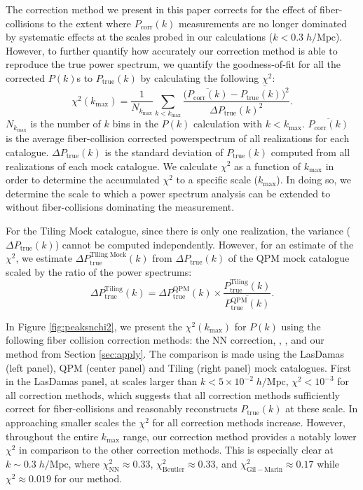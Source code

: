 \documentclass{emulateapj}
\begin{document}
The correction method we present in this paper corrects for the effect of fiber-collisions to the extent where $P_\mathrm{corr}(k)$ measurements are no longer dominated by systematic effects at the scales probed in our calculations ($k < 0.3 \; h/\mathrm{Mpc}$). However, to further quantify how accurately our correction method is able to reproduce the true power spectrum, we quantify the goodness-of-fit for all the corrected $P(k)$s to $P_\mathrm{true}(k)$ by calculating the following $\chi^2$: 
\begin{equation}
\chi^2 (k_\mathrm{max}) = \frac{1}{N_{k_\mathrm{max}}} \sum\limits_{k< k_\mathrm{max}} \frac{(\overline{P_\mathrm{corr}(k)} - \overline{P_\mathrm{true}(k))^2}}{\Delta P_\mathrm{true} (k)^2}. \label{eq:chi2}
\end{equation}
$N_{k_\mathrm{max}}$ is the number of $k$ bins in the $P(k)$ calculation with $k < k_\mathrm{max}$. $\overline{P_\mathrm{corr}(k)}$ is the average fiber-collision corrected powerspectrum of all realizations for each catalogue. $\Delta P_\mathrm{true}(k)$ is the standard deviation of $P_\mathrm{true}(k)$ computed from all realizations of each mock catalogue. We calculate $\chi^2$ as a function of $k_\mathrm{max}$ in order to determine the accumulated $\chi^2$ to a specific scale ($k_\mathrm{max}$). In doing so, we determine the scale to which a power spectrum analysis can be extended to without fiber-collisions dominating the measurement. 

For the Tiling Mock catalogue, since there is only one realization, the variance ($\Delta P_\mathrm{true} (k)$) cannot be computed independently. However, for an estimate of the $\chi^2$, we estimate $\Delta P_\mathrm{true}^\mathrm{Tiling\;Mock}(k)$ from $\Delta P_\mathrm{true} (k)$ of the QPM mock catalogue scaled by the ratio of the power spectrums:
\begin{equation}
\Delta P_\mathrm{true}^\mathrm{Tiling}(k) = \Delta P_\mathrm{true}^\mathrm{QPM}(k) \times \frac{P_\mathrm{true}^\mathrm{Tiling}(k)}{\overline{P^\mathrm{QPM}_\mathrm{true}(k)}}.
\end{equation}

In Figure \ref{fig:peaksnchi2}, we present the $\chi^2(k_\mathrm{max})$ for $P(k)$ using the following fiber collision correction methods: the NN correction, \cite{Beutler:2014aa}, \cite{Gil-Marin:2014aa}, and our method from Section \ref{sec:apply}. The comparison is made using the LasDamas (left panel), QPM (center panel) and Tiling (right panel) mock catalogues. First in the LasDamas panel, at scales larger than $k < 5 \times 10^{-2} \; h/\mathrm{Mpc}$, $\chi^2 < 10^{-3}$ for all correction methods, which suggests that all correction methods sufficiently correct for fiber-collisions and reasonably reconstructs $P_\mathrm{true}(k)$ at these scale. In approaching smaller scales the $\chi^2$ for all correction methods increase. However, throughout the entire $k_\mathrm{max}$ range, our correction method provides a notably lower $\chi^2$ in comparison to the other correction methods. This is especially clear at $k \sim 0.3 \; h/\mathrm{Mpc}$, where $\chi^2_\mathrm{NN} \approx 0.33$, $\chi^2_\mathrm{Beutler} \approx 0.33$, and $\chi^2_\mathrm{Gil-Marin} \approx 0.17$ while $\chi^2 \approx 0.019$ for our method. 
\end{document}
